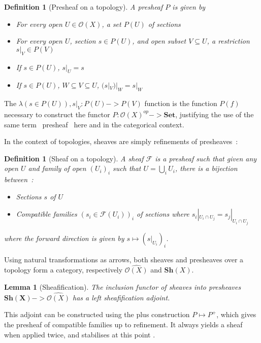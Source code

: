 \documentclass[11pt]{article}
\newtheorem{lemma}[theorem]{Lemma}
\newtheorem{definition}[theorem]{Definition}
\newcommand{\0}{\mathbf{0}}
\newcommand{\1}{\mathbf{1}}
\begin{document}
\begin{definition}[Presheaf on a topology]
    A \emph{presheaf} $P$ is given by
    \begin{itemize}
        \item For every open $U \in \mathcal{O}(X)$, a set $P(U)$ of \emph{sections}
        \item For every open $U$, section $s\in P(U)$, and open subset $V\subseteq U$, a \emph{restriction} $s|_V\in P(V)$
        \item If $s\in P(U)$, $s|_U = s$
        \item If $s\in P(U)$, $W\subseteq V \subseteq U$, $(s|_V)|_W = s|_W$
    \end{itemize}
\end{definition}
The $\lambda (s\in P(U)), s|_V : P(U) -> P(V)$ function is the function $P(f)$ necessary to construct the functor $P : \mathcal{O}(X)^{op} -> \mathbf{Set}$, justifying the use of the same term \guillemotleft~presheaf \guillemotright\ here and in the categorical context.

In the context of topologies, sheaves are simply refinements of presheaves~:
\begin{definition}[Sheaf on a topology]
    A \emph{sheaf} $\mathcal{F}$ is a presheaf such that given any open  $U$ and family of open $(U_i)_i$ such that $U = \bigcup_i U_i$, there is a bijection between~:
    \begin{itemize}
        \item Sections $s$ of $U$
        \item \emph{Compatible} families $(s_i\in \mathcal{F}(U_i))_i$ of sections where $s_i|_{U_i\cap U_j} = s_j|_{U_i\cap U_j}$
    \end{itemize}
    where the forward direction is given by $s \mapsto (s|_{U_i})_i$.
\end{definition}

Using natural transformations as arrows, both sheaves and presheaves over a topology form a category, respectively $\widehat{\mathcal{O}(X)}$ and $\mathbf{Sh}(X)$.
\begin{lemma}[Sheafification]
    The inclusion functor of sheaves into presheaves $\mathbf{Sh(X)} -> \widehat{\mathcal{O}(X)}$ has a left \emph{sheafification} adjoint.
\end{lemma}

This adjoint can be constructed using the plus construction $P \mapsto P^{+}$, which gives the presheaf of compatible families up to refinement.
It always yields a sheaf when applied twice, and stabilises at this point \cite{maclane2012sheaves}.
\end{document}
